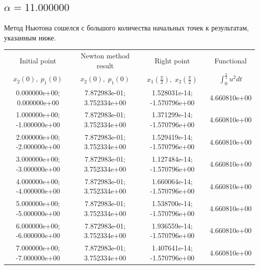 \documentclass[titlepage]{article}
\def\l{\left}
\def\r{\right}
\begin{document}
\subsection{$\alpha = 11.000000$} 
Метод Ньютона сошелся с большого количества начальных точек к результатам, указанным ниже. \\ 
\begin{tabular}{ | c | c | c | c |} 
\hline 
Initial point  & Newton method result & Right point & Functional 
 \\ $x_2(0), \; p_1(0)$ & $x_2(0), \; p_1(0)$ & $x_1\l(\frac{\pi}{2}\r), \; x_2\l(\frac{\pi}{2}\r)$ & $\int_{0}^{\frac{\pi}{2}}u^2dt$  \\ \hline 
0.000000e+00; 0.000000e+00 & 7.872983e-01; 3.752334e+00 & 1.528031e-14; -1.570796e+00 & 4.660810e+00 \\ \hline 
1.000000e+00; -1.000000e+00 & 7.872983e-01; 3.752334e+00 & 1.371299e-14; -1.570796e+00 & 4.660810e+00 \\ \hline 
2.000000e+00; -2.000000e+00 & 7.872983e-01; 3.752334e+00 & 1.529419e-14; -1.570796e+00 & 4.660810e+00 \\ \hline 
3.000000e+00; -3.000000e+00 & 7.872983e-01; 3.752334e+00 & 1.127484e-14; -1.570796e+00 & 4.660810e+00 \\ \hline 
4.000000e+00; -4.000000e+00 & 7.872983e-01; 3.752334e+00 & 1.660064e-14; -1.570796e+00 & 4.660810e+00 \\ \hline 
5.000000e+00; -5.000000e+00 & 7.872983e-01; 3.752334e+00 & 1.538700e-14; -1.570796e+00 & 4.660810e+00 \\ \hline 
6.000000e+00; -6.000000e+00 & 7.872983e-01; 3.752334e+00 & 1.936559e-14; -1.570796e+00 & 4.660810e+00 \\ \hline 
7.000000e+00; -7.000000e+00 & 7.872983e-01; 3.752334e+00 & 1.407641e-14; -1.570796e+00 & 4.660810e+00 \\ \hline 
\end{tabular} 
\end{document}
